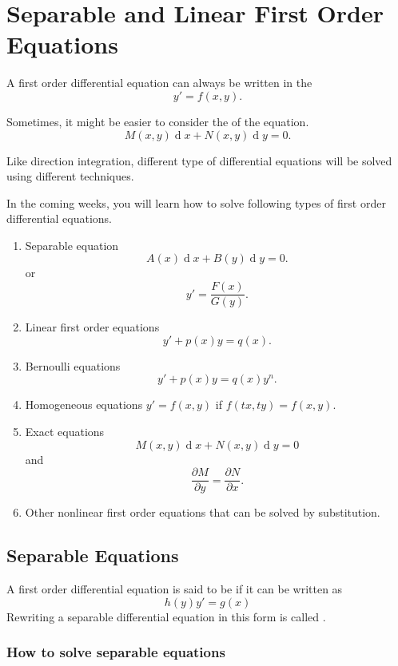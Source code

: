 \chapter{Separable and Linear First Order Equations}

A first order differential equation can always be written in the 
\[y'=f(x, y).\]

Sometimes, it might be easier to consider the  of the equation.
\[M(x, y)\operatorname{d} x + N(x, y)\operatorname{d} y=0.\]

Like direction integration, different type of differential equations will be solved using different techniques. 

In the coming weeks, you will learn how to solve following types of first order differential equations.

\begin{enumerate}
  \item Separable equation
\[A(x)\operatorname{d} x+B(y)\operatorname{d} y=0.\]
  or \[y'=\frac{F(x)}{G(y)}.\]
  \item Linear first order equations
\[y' + p(x) y = q(x).\]
  \item Bernoulli equations
\[y' + p(x) y = q(x)y^n.\]
  \item Homogeneous equations
  $y'=f(x,y)$ if $f(tx,ty)=f(x,y)$. 
  \item Exact equations 
\[M(x,y)\operatorname{d} x+N(x,y)\operatorname{d} y=0\] and 
\[\frac{\partial{M}}{\partial y}=\frac{\partial{N}}{\partial x}.\]
\item Other nonlinear first order equations that can be solved by substitution.
\end{enumerate}

\section{Separable Equations}
\begin{definition}
  A first order differential equation is said to be  if it can be written as
  \begin{equation}
    h(y)y'=g(x)\label{eq:2.1.1}
  \end{equation}
  Rewriting a separable differential equation in this form is called .
\end{definition}


\subsection{How to solve separable equations}

